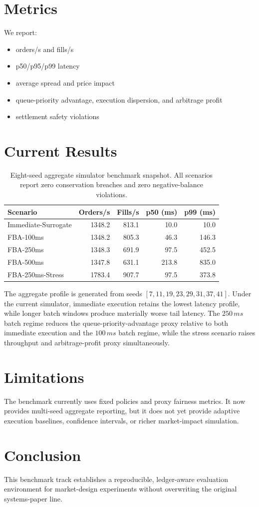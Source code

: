 \documentclass[11pt]{article}
\begin{document}
\section{Metrics}
We report:
\begin{itemize}[leftmargin=*]
  \item orders/s and fills/s
  \item p50/p95/p99 latency
  \item average spread and price impact
  \item queue-priority advantage, execution dispersion, and arbitrage profit
  \item settlement safety violations
\end{itemize}

\section{Current Results}
\begin{table}[h]
\centering
\begin{tabular}{lrrrr}
\toprule
Scenario & Orders/s & Fills/s & p50 (ms) & p99 (ms) \\
\midrule
Immediate-Surrogate & 1348.2 & 813.1 & 10.0 & 10.0 \\
FBA-100ms & 1348.2 & 805.3 & 46.3 & 146.3 \\
FBA-250ms & 1348.3 & 691.9 & 97.5 & 452.5 \\
FBA-500ms & 1347.8 & 631.1 & 213.8 & 835.0 \\
FBA-250ms-Stress & 1783.4 & 907.7 & 97.5 & 373.8 \\
\bottomrule
\end{tabular}
\caption{Eight-seed aggregate simulator benchmark snapshot. All scenarios report zero conservation breaches and zero negative-balance violations.}
\end{table}

The aggregate profile is generated from seeds $[7, 11, 19, 23, 29, 31, 37, 41]$. Under the current simulator, immediate execution retains the lowest latency profile, while longer batch windows produce materially worse tail latency. The $250\,ms$ batch regime reduces the queue-priority-advantage proxy relative to both immediate execution and the $100\,ms$ batch regime, while the stress scenario raises throughput and arbitrage-profit proxy simultaneously.

\section{Limitations}
The benchmark currently uses fixed policies and proxy fairness metrics. It now provides multi-seed aggregate reporting, but it does not yet provide adaptive execution baselines, confidence intervals, or richer market-impact simulation.

\section{Conclusion}
This benchmark track establishes a reproducible, ledger-aware evaluation environment for market-design experiments without overwriting the original systems-paper line.



\end{document}
